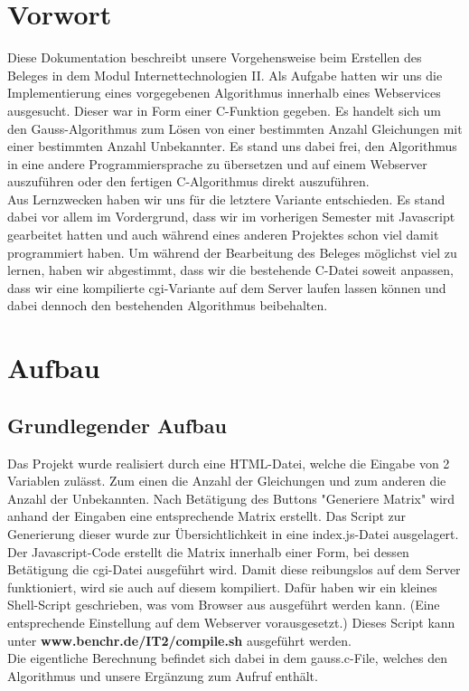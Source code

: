 \documentclass[a4paper,oneside,titlepage,12pt]{article}
\begin{document}
\section{Vorwort}
Diese Dokumentation beschreibt unsere Vorgehensweise beim Erstellen des Beleges in dem Modul Internettechnologien II. Als Aufgabe hatten wir uns die Implementierung eines vorgegebenen Algorithmus innerhalb eines Webservices ausgesucht. Dieser war in Form einer C-Funktion gegeben. Es handelt sich um den Gauss-Algorithmus zum Lösen von einer bestimmten Anzahl Gleichungen mit einer bestimmten Anzahl Unbekannter. Es stand uns dabei frei, den Algorithmus in eine andere Programmiersprache zu übersetzen und auf einem Webserver auszuführen oder den fertigen C-Algorithmus direkt auszuführen. \\ Aus Lernzwecken haben wir uns für die letztere Variante entschieden. Es stand dabei vor allem im Vordergrund, dass wir im vorherigen Semester mit Javascript gearbeitet hatten und auch während eines anderen Projektes schon viel damit programmiert haben. Um während der Bearbeitung des Beleges möglichst viel zu lernen, haben wir abgestimmt, dass wir die bestehende C-Datei soweit anpassen, dass wir eine kompilierte cgi-Variante auf dem Server laufen lassen können und dabei dennoch den bestehenden Algorithmus beibehalten.
\clearpage

\section{Aufbau}
\subsection{Grundlegender Aufbau}
Das Projekt wurde realisiert durch eine HTML-Datei, welche die Eingabe von 2 Variablen zulässt. Zum einen die Anzahl der Gleichungen und zum anderen die Anzahl der Unbekannten. Nach Betätigung des Buttons "Generiere Matrix" wird anhand der Eingaben eine entsprechende Matrix erstellt. Das Script zur Generierung dieser wurde zur Übersichtlichkeit in eine index.js-Datei ausgelagert.\\ Der Javascript-Code erstellt die Matrix innerhalb einer Form, bei dessen Betätigung die cgi-Datei ausgeführt wird. Damit diese reibungslos auf dem Server funktioniert, wird sie auch auf diesem kompiliert. Dafür haben wir ein kleines Shell-Script geschrieben, was vom Browser aus ausgeführt werden kann. (Eine entsprechende Einstellung auf dem Webserver vorausgesetzt.) Dieses Script kann unter \textbf{www.benchr.de/IT2/compile.sh} ausgeführt werden. \\ Die eigentliche Berechnung befindet sich dabei in dem gauss.c-File, welches den Algorithmus und unsere Ergänzung zum Aufruf enthält.
\end{document}
